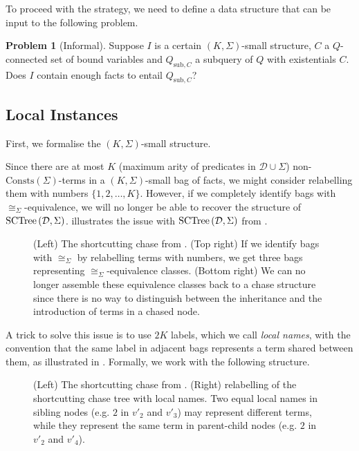 \documentclass[12pt]{report}
\theoremstyle{plain}
\theoremstyle{definition}
\newtheorem{problem}[theorem]{Problem}
\def\Consts{{\mathrm{Consts}}}
\newcommand{\SCTree}[2]{\ensuremath{\normalfont{\textrm{SCTree}} \left( #1, #2 \right)}}
\begin{document}
To proceed with the strategy, we need to define a data structure that can be input to the following problem.

\begin{problem}[Informal]
\label{informal-subquery-entailment-problem}
  Suppose $I$ is a certain $(K, \Sigma)$-small structure, $C$ a $Q$-connected set of bound variables and $Q_{\mathrm{sub}, C}$ a subquery of $Q$ with existentials $C$. Does $I$ contain enough facts to entail $Q_{\mathrm{sub}, C}$?
\end{problem}

\subsection{Local Instances}
\label{subsection:local-instances}

First, we formalise the $(K, \Sigma)$-small structure.

Since there are at most $K$ (maximum arity of predicates in $\mathcal{D} \cup \Sigma$) non-$\Consts(\Sigma)$-terms in a $(K, \Sigma)$-small bag of facts, we might consider relabelling them with numbers $\{ 1, 2, \ldots, K \}$. However, if we completely identify bags with $\cong_\Sigma$-equivalence, we will no longer be able to recover the structure of $\SCTree{\mathcal{D}}{\Sigma}$.  illustrates the issue with $\SCTree{\mathcal{D}}{\Sigma}$ from .

\begin{figure}[ht]
  \centering
  
  \caption{(Left) The shortcutting chase from . (Top right) If we identify bags with $\cong_\Sigma$ by relabelling terms with numbers, we get three bags representing $\cong_\Sigma$-equivalence classes. (Bottom right) We can no longer assemble these equivalence classes back to a chase structure since there is no way to distinguish between the inheritance and the introduction of terms in a chased node.}
  \label{sctree-simple-example-equivalence-classes}
\end{figure}

A trick to solve this issue is to use $2K$ labels, which we call \emph{local names}, with the convention that the same label in adjacent bags represents a term shared between them, as illustrated in . Formally, we work with the following structure.

\begin{figure}[ht]
  \centering
  
  \caption{(Left) The shortcutting chase from . (Right) relabelling of the shortcutting chase tree with local names. Two equal local names in sibling nodes (e.g. $2$ in $v'_2$ and $v'_3$) may represent different terms, while they represent the same term in parent-child nodes (e.g. $2$ in $v'_2$ and $v'_4$).}
  \label{sctree-simple-example-local-names}
\end{figure}
\end{document}
